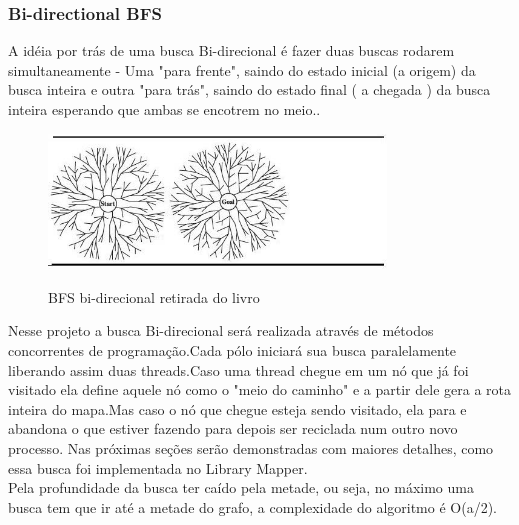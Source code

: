\documentclass[a4paper,10pt]{article}
\begin{document}
      \subsubsection{Bi-directional BFS}
	A idéia por trás de uma busca Bi-direcional é fazer duas buscas rodarem simultaneamente - Uma "para frente", 	 
	saindo do estado inicial (a origem) da busca inteira e outra "para trás",  saindo do estado final ( a chegada ) 
	da busca inteira esperando que ambas se encotrem no meio.\cite{bidirecional}. 
 	\begin{figure}[H]
	\centering
	\includegraphics[width=0.8\textwidth]{./imgs/bi-directional.png}\\[1cm]   
	\caption{BFS bi-direcional retirada do livro \cite{bidirecional}}
      	\end{figure}
	Nesse projeto a busca Bi-direcional será realizada através de métodos concorrentes de programação.Cada pólo
	iniciará sua busca paralelamente liberando assim duas threads.Caso uma thread chegue em um nó que já foi 
	visitado ela define aquele nó como o "meio do caminho" e a partir dele gera a rota inteira do mapa.Mas caso o nó que
	chegue esteja sendo visitado, ela para e abandona o que estiver fazendo para depois ser reciclada num outro novo processo.
	Nas próximas seções serão demonstradas com maiores detalhes, como essa busca foi implementada no Library Mapper.\\
 
	Pela profundidade da busca ter caído pela metade, ou seja, no máximo uma busca tem que ir até a metade do grafo, a 
	complexidade do algoritmo é O(a/2).\\
	

	
	
\end{document}
